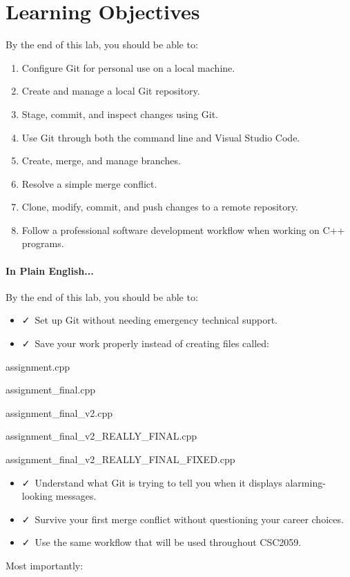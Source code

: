 \documentclass{csc2059practical}
\begin{document}
\section{Learning Objectives}
\begin{learningoutcomes}
By the end of this lab, you should be able to:

\begin{enumerate}
  \item Configure Git for personal use on a local machine.
  \item Create and manage a local Git repository.
  \item Stage, commit, and inspect changes using Git.
  \item Use Git through both the command line and Visual Studio Code.
  \item Create, merge, and manage branches.
  \item Resolve a simple merge conflict.
  \item Clone, modify, commit, and push changes to a remote repository.
  \item Follow a professional software development workflow when working on C++ programs.
\end{enumerate}
\end{learningoutcomes}
\paragraph{In Plain English...}
By the end of this lab, you should be able to:

\begin{itemize}
  \item \faCheck\ Set up Git without needing emergency technical support.
  \item \faCheck\ Save your work properly instead of creating files called:
\end{itemize}
\begin{terminalplain}
assignment.cpp
\end{terminalplain}
\begin{terminalplain}
assignment\_final.cpp
\end{terminalplain}
\begin{terminalplain}
assignment\_final\_v2.cpp
\end{terminalplain}
\begin{terminalplain}
assignment\_final\_v2\_REALLY\_FINAL.cpp
\end{terminalplain}
\begin{terminalplain}
assignment\_final\_v2\_REALLY\_FINAL\_FIXED.cpp
\end{terminalplain}
\begin{itemize}
  \item \faCheck\ Understand what Git is trying to tell you when it displays alarming-looking messages.
  \item \faCheck\ Survive your first merge conflict without questioning your career choices.
  \item \faCheck\ Use the same workflow that will be used throughout CSC2059.
\end{itemize}
Most importantly:
\end{document}

